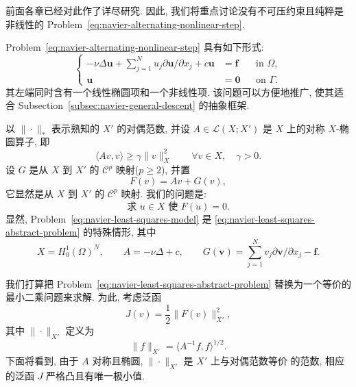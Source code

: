 前面各章已经对此作了详尽研究. 因此, 我们将重点讨论没有不可压约束且纯粹是非线性的
Problem~\eqref{eq:navier-alternating-nonlinear-step}.

Problem~\eqref{eq:navier-alternating-nonlinear-step} 具有如下形式:
\begin{equation}
\label{eq:navier-least-squares-model}
\left\{
\begin{aligned}
-\nu\Delta\boldsymbol u+
\sum_{j=1}^N u_j\partial\boldsymbol u/\partial x_j+c\boldsymbol u
&=\boldsymbol f &&\text{in }\Omega,\\
\boldsymbol u&=\boldsymbol0 &&\text{on }\Gamma.
\end{aligned}
\right.
\end{equation}
其左端同时含有一个线性椭圆项和一个非线性项. 该问题可以方便地推广, 使其适合
Subsection~\ref{subsec:navier-general-descent} 的抽象框架.

以 $\|\cdot\|_*$ 表示熟知的 $X'$ 的对偶范数, 并设
$A\in\mathcal L(X;X')$ 是 $X$ 上的对称 $X$-椭圆算子, 即
\begin{equation}
\label{eq:navier-least-squares-ellipticity}
\langle Av,v\rangle\geq\gamma\|v\|_X^2
\qquad\forall v\in X,\quad\gamma>0.
\end{equation}
设 $G$ 是从 $X$ 到 $X'$ 的 $\mathcal C^p$ 映射($p\geq2$), 并置
\begin{equation}
\label{eq:navier-least-squares-operator}
F(v)=Av+G(v),
\end{equation}
它显然是从 $X$ 到 $X'$ 的 $\mathcal C^p$ 映射. 我们的问题是:
\begin{equation}
\label{eq:navier-least-squares-abstract-problem}
\text{求 }u\in X\text{ 使 }F(u)=0.
\end{equation}
显然, Problem~\eqref{eq:navier-least-squares-model} 是
\eqref{eq:navier-least-squares-abstract-problem} 的特殊情形, 其中
\[
X=H_0^1(\Omega)^N,
\qquad A=-\nu\Delta+c,
\qquad G(\boldsymbol v)=\sum_{j=1}^Nv_j\partial\boldsymbol v/\partial x_j-
\boldsymbol f.
\]

我们打算把 Problem~\eqref{eq:navier-least-squares-abstract-problem} 替换为一个等价的
最小二乘问题来求解. 为此, 考虑泛函
\[
J(v)=\frac12\|F(v)\|_{X'}^2,
\]
其中 $\|\cdot\|_{X'}$ 定义为
\begin{equation}
\label{eq:navier-least-squares-dual-norm}
\|f\|_{X'}=\langle A^{-1}f,f\rangle^{1/2}.
\end{equation}
下面将看到, 由于 $A$ 对称且椭圆, $\|\cdot\|_{X'}$ 是 $X'$ 上与对偶范数等价
的范数, 相应的泛函 $J$ 严格凸且有唯一极小值.

